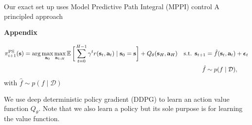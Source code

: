 \documentclass{article}
\newcommand{\state}{\ensuremath{\mathbf{s}}}
\newcommand{\action}{\ensuremath{\mathbf{a}}}
\newcommand{\noise}{\ensuremath{\bm\epsilon}}
\newcommand{\dataset}{\ensuremath{\mathcal{D}}}
\newcommand{\Horizon}{\ensuremath{H}}
\newcommand{\inputDomain}{\ensuremath{\mathbb{R}^{D}}}
\newcommand{\outputDomain}{\ensuremath{\mathbb{R}^{C}}}
\newcommand{\transitionFn}{\ensuremath{f}}
\newcommand{\weights}{\ensuremath{\mathbf{w}}}
\newcommand{\transitionFnWithParams}{\ensuremath{\transitionFn_{\weights}}}
\newcommand{\policy}{\ensuremath{\pi}}
\begin{document}
Our exact set up uses
Model Predictive Path Integral (MPPI) control
\cite{panSample2015}
\cite{williamsModel2017}
A principled approach

\textbf{Appendix}

\begin{align} \label{eq-fast-update-mpc}
  \policy_{i+1}^{\text{PS}}(\state) = \arg \max_{\action_{0}} \max_{\action_{1:\Horizon}}
\E \bigg[ \sum_{t=0}^{H-1} \gamma^{t} r(\state_{t},\action_{t}) \mid \state_{0}=\state  \bigg] + Q_{\theta}(\state_{\Horizon}, \action_{H})
\quad \text{s.t. } \state_{t+1} &= \hat{\transitionFn}(\state_{t}, \action_{t}) + \noise_{t} \\
\hat{\transitionFn} &\sim p(\transitionFn \mid \dataset),
\end{align}
with $\hat{\transitionFn} \sim p(\transitionFn \mid \dataset)$



We use deep deterministic policy gradient (DDPG) \cite{lillicrapContinuousControlDeep2016} to learn an action value function $Q_{\theta}$.
Note that we also learn a policy but its sole purpose is for learning the value function.





\end{document}
